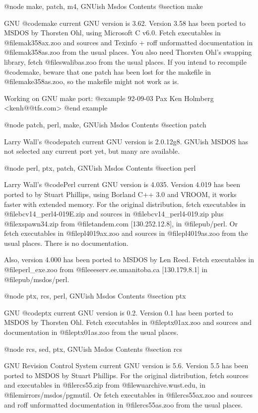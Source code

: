 @node make, patch, m4, GNUish Msdos Contents
@section make

GNU @code{make} current GNU version is 3.62.  Version 3.58 has been
ported to MSDOS by Thorsten Ohl, using Microsoft C v6.0.  Fetch
executables in @file{mak358ax.zoo} and sources and Texinfo + roff
unformatted documentation in @file{mak358as.zoo} from the usual places.
You also need Thorsten Ohl's swapping library, fetch @file{swalibas.zoo}
from the usual places.  If you intend to recompile @code{make}, beware
that one patch has been lost for the makefile in @file{make358as.zoo},
so the makefile might not work as is.

Working on GNU make port:
@example
92-09-03 Pax Ken Holmberg <kenh@@tfs.com>
@end example

@node patch, perl, make, GNUish Msdos Contents
@section patch

Larry Wall's @code{patch} current GNU version is 2.0.12g8.  GNUish MSDOS
has not selected any current port yet, but many are available.

@node perl, ptx, patch, GNUish Msdos Contents
@section perl

Larry Wall's @code{Perl} current GNU version is 4.035.  Version 4.019
has been ported to by Stuart Phillips, using Borland C++ 3.0 and VROOM,
it works faster with extended memory.  For the original distribution,
fetch executables in @file{bcv14_perl4-019E.zip} and sources in
@file{bcv14_perl4-019.zip} plus @file{xspawn34.zip} from
@file{tandem.com} [130.252.12.8], in @file{pub/perl}. Or fetch
executables in @file{pl4019ax.zoo} and sources in @file{pl4019as.zoo}
from the usual places.  There is no documentation.

Also, version 4.000 has been ported to MSDOS by Len Reed.  Fetch
executables in @file{perl_exe.zoo} from @file{eeserv.ee.umanitoba.ca}
[130.179.8.1] in @file{pub/msdos/perl}.

@node ptx, rcs, perl, GNUish Msdos Contents
@section ptx

GNU @code{ptx} current GNU version is 0.2.  Version 0.1 has been ported
to MSDOS by Thorsten Ohl.  Fetch executables in @file{ptx01ax.zoo} and
sources and documentation in @file{ptx01as.zoo} from the usual places.

@node rcs, sed, ptx, GNUish Msdos Contents
@section rcs

GNU Revision Control System current GNU version is 5.6.  Version 5.5 has
been ported to MSDOS by Stuart Phillips.  For the original distribution,
fetch sources and executables in @file{rcs55.zip} from
@file{wuarchive.wust.edu}, in @file{mirrors/msdos/pgmutil}. Or fetch
executables in @file{rcs55ax.zoo} and sources and roff unformatted
documentation in @file{rcs55as.zoo} from the usual places.

